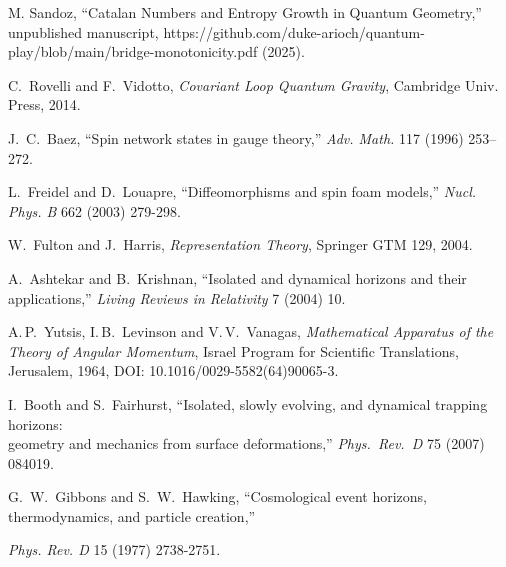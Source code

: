 \documentclass[11pt]{article}
\begin{document}
\begin{thebibliography}{8}

M. Sandoz, ``Catalan Numbers and Entropy Growth in Quantum Geometry,'' 
unpublished manuscript, https://github.com/duke-arioch/quantum-play/blob/main/bridge-monotonicity.pdf (2025).

 C.~Rovelli and F.~Vidotto, \emph{Covariant Loop Quantum Gravity}, Cambridge Univ. Press, 2014.

 J.~C.~Baez, “Spin network states in gauge theory,” \emph{Adv. Math.} 117 (1996) 253–272.

 L.~Freidel and D.~Louapre, ``Diffeomorphisms and spin foam models,'' \emph{Nucl. Phys. B} 662 (2003) 279-298.

 W.~Fulton and J.~Harris, \emph{Representation Theory}, Springer GTM 129, 2004.

 A.~Ashtekar and B.~Krishnan, “Isolated and dynamical horizons and their applications,” \emph{Living Reviews in Relativity} 7 (2004) 10.

 A.\,P.~Yutsis, I.\,B.~Levinson and V.\,V.~Vanagas, \emph{Mathematical Apparatus of the Theory of Angular Momentum}, Israel Program for Scientific Translations, Jerusalem, 1964, DOI: 10.1016/0029-5582(64)90065-3.

  I.~Booth and S.~Fairhurst, “Isolated, slowly evolving, and dynamical trapping horizons:\\
  geometry and mechanics from surface deformations,”
  \emph{Phys.\ Rev.\ D} 75 (2007) 084019.


G.~W.~Gibbons and S.~W.~Hawking, “Cosmological event horizons, thermodynamics, and particle creation,”

\emph{Phys. Rev. D} 15 (1977) 2738-2751.

\end{thebibliography}
\end{document}
